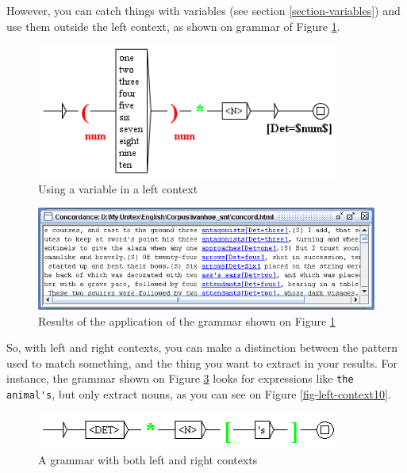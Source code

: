 \bigskip
\noindent However, you can catch things with variables (see section
\ref{section-variables}) and use them outside the left context, as shown on
grammar of Figure \ref{fig-left-context7}.

\begin{figure}[!ht]
\begin{center}
\includegraphics[width=10cm]{resources/img/fig6-17g.png}
\caption{Using a variable in a left context\label{fig-left-context7}}
\end{center}
\end{figure}

\begin{figure}[!ht]
\begin{center}
\includegraphics[width=15cm]{resources/img/fig6-17h.png}
\caption{Results of the application of the grammar shown on Figure
\ref{fig-left-context7}\label{fig-left-context8}}
\end{center}
\end{figure}

\bigskip
\noindent So, with left and right contexts, you can make a distinction between
the pattern used to match something, and the thing you want to extract in your
results. For instance, the grammar shown on Figure \ref{fig-left-context9} looks
for expressions like \verb$the animal's$, but only extract nouns, as you can
see on Figure \ref{fig-left-context10}.

\begin{figure}[!ht]
\begin{center}
\includegraphics[width=10cm]{resources/img/fig6-17i.png}
\caption{A grammar with both left and right contexts\label{fig-left-context9}}
\end{center}
\end{figure}

